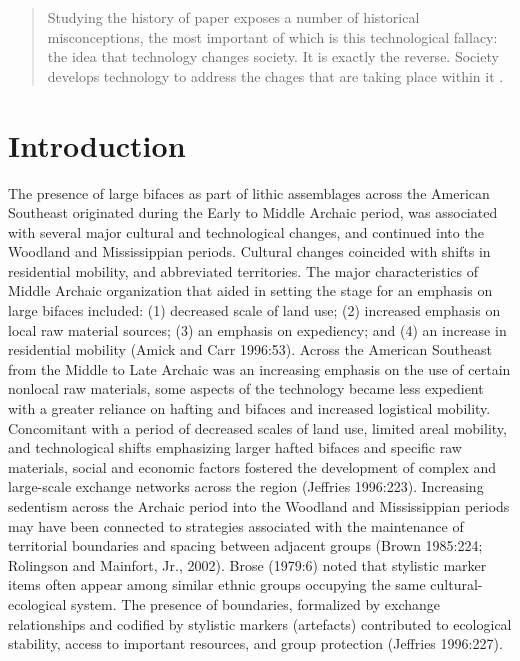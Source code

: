 \documentclass[]{interact}
\theoremstyle{plain}%
\theoremstyle{definition}
\theoremstyle{remark}
\begin{document}
\begin{quote}
Studying the history of paper exposes a number of historical
misconceptions, the most important of which is this technological
fallacy: the idea that technology changes society. It is exactly the
reverse. Society develops technology to address the chages that are
taking place within it \citep[xiv]{RN10878}.
\end{quote}

\hypertarget{introduction}{%
\section{Introduction}\label{introduction}}

The presence of large bifaces as part of lithic assemblages across the
American Southeast originated during the Early to Middle Archaic period,
was associated with several major cultural and technological changes,
and continued into the Woodland and Mississippian periods. Cultural
changes coincided with shifts in residential mobility, and abbreviated
territories. The major characteristics of Middle Archaic organization
that aided in setting the stage for an emphasis on large bifaces
included: (1) decreased scale of land use; (2) increased emphasis on
local raw material sources; (3) an emphasis on expediency; and (4) an
increase in residential mobility (Amick and Carr 1996:53). Across the
American Southeast from the Middle to Late Archaic was an increasing
emphasis on the use of certain nonlocal raw materials, some aspects of
the technology became less expedient with a greater reliance on hafting
and bifaces and increased logistical mobility. Concomitant with a period
of decreased scales of land use, limited areal mobility, and
technological shifts emphasizing larger hafted bifaces and specific raw
materials, social and economic factors fostered the development of
complex and large-scale exchange networks across the region (Jeffries
1996:223). Increasing sedentism across the Archaic period into the
Woodland and Mississippian periods may have been connected to strategies
associated with the maintenance of territorial boundaries and spacing
between adjacent groups (Brown 1985:224; Rolingson and Mainfort, Jr.,
2002). Brose (1979:6) noted that stylistic marker items often appear
among similar ethnic groups occupying the same cultural-ecological
system. The presence of boundaries, formalized by exchange relationships
and codified by stylistic markers (artefacts) contributed to ecological
stability, access to important resources, and group protection (Jeffries
1996:227).
\end{document}
